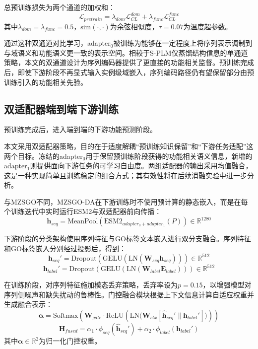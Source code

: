 总预训练损失为两个通道的加权和：
\begin{equation}
    \mathcal{L}_{pretrain} = \lambda_{dom}\mathcal{L}_{CL}^{dom} + \lambda_{func}\mathcal{L}_{CL}^{func}
\end{equation}
其中$\lambda_{dom}=\lambda_{func}=0.5$，$\text{sim}(\cdot,\cdot)$为余弦相似度，$\tau=0.07$为温度超参数。

通过这种双通道对比学习，adapter$_0$被训练为能够在一定程度上将序列表示调制到与域语义和功能语义更一致的表示空间。相较于S-PLM\cite{wang2025splm}仅蒸馏结构信息的单通道策略，本文的双通道设计为序列编码器提供了更直接的功能相关监督。预训练完成后，即使下游阶段不再显式输入实例级域嵌入，序列编码路径仍有望保留部分由预训练引入的功能相关先验。

\subsection{双适配器端到端下游训练}

预训练完成后，进入端到端的下游功能预测阶段。

本文采用双适配器策略，目的在于适度解耦“预训练知识保留”和“下游任务适配”这两个目标。冻结的adapter$_0$用于保留预训练阶段获得的功能相关语义信息，新增的adapter$_1$则提供面向下游任务的可学习自由度。两组适配器的输出采用均值融合，这是一种实现简单且训练稳定的组合方式；其有效性将在后续消融实验中进一步分析。

与MZSGO不同，MZSGO-DA在下游训练时不使用预计算的静态嵌入，而是在每个训练迭代中实时运行ESM2与双适配器前向传播：
\begin{equation}
    \mathbf{h}_{seq} = \text{MeanPool}(\text{ESM2}_{adapter_0+adapter_1}(P)) \in \mathbb{R}^{1280}
\end{equation}

下游阶段的分类架构使用序列特征与GO标签文本嵌入进行双分支融合。序列特征和GO标签嵌入分别经过投影后，得到：
\begin{equation}
    \mathbf{h}_{seq}' = \text{Dropout}(\text{GELU}(\text{LN}(\mathbf{W}_{seq}\mathbf{h}_{seq}))) \in \mathbb{R}^{512}
\end{equation}
\begin{equation}
    \mathbf{h}_{label}' = \text{Dropout}(\text{GELU}(\text{LN}(\mathbf{W}_{label}\mathbf{E}_{label}))) \in \mathbb{R}^{512}
\end{equation}

在训练阶段，对序列特征施加模态丢弃策略，丢弃率设为$p=0.15$，以增强模型对序列侧噪声和缺失扰动的鲁棒性。门控融合模块根据上下文信息计算自适应权重并生成融合表示：
\begin{equation}
    \boldsymbol{\alpha} =
    \text{Softmax}
    \left(
    \mathbf{W}_{gate}\cdot
    \text{ReLU}
    \left(
    \text{LN}\big(\mathbf{W}_{ctx}[\hat{\mathbf{h}}_{seq}' \parallel \mathbf{h}_{label}']\big)
    \right)
    \right)
\end{equation}
\begin{equation}
    \mathbf{H}_{fused} = \alpha_1 \cdot \phi_{seq}(\hat{\mathbf{h}}_{seq}') + \alpha_2 \cdot \phi_{label}(\mathbf{h}_{label}')
\end{equation}
其中$\boldsymbol{\alpha}\in\mathbb{R}^{2}$为归一化门控权重。

